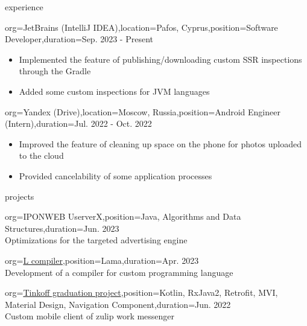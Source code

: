 \documentclass{resume}
\begin{document}
\begin{ResumeSection}{experience}
	\begin{ResumeSubsection}{org=JetBrains (IntelliJ IDEA),location={Pafos, Cyprus},position={Software Developer},duration=Sep. 2023 - Present}
        \begin{itemize}
            \item Implemented the feature of publishing/downloading custom SSR inspections through the Gradle
            \item Added some custom inspections for JVM languages
        \end{itemize}
    \end{ResumeSubsection}
	\begin{ResumeSubsection}{org=Yandex (Drive),location={Moscow, Russia},position={Android Engineer (Intern)},duration=Jul. 2022 - Oct. 2022} 
        \begin{itemize}
            \item Improved the feature of cleaning up space on the phone for photos uploaded to the cloud
            \item Provided cancelability of some application processes
        \end{itemize}
    \end{ResumeSubsection}
\end{ResumeSection}

\begin{ResumeSection}{projects}
\begin{ResumeSubsection}{org=IPONWEB UserverX,position={Java, Algorithms and Data Structures},duration={Jun. 2023}} \\
Optimizations for the targeted advertising engine \vspace{4pt}

\end{ResumeSubsection}

	\begin{ResumeSubsection}{org=\href{https://github.com/Hardes1/compilers-supplementary}{L compiler},position={Lama},duration={Apr. 2023}} \\
	Development of a compiler for custom programming language
 \vspace{4pt}

\end{ResumeSubsection}
	\begin{ResumeSubsection}{org=\href{https://github.com/Hardes1/ZulipClient}{Tinkoff graduation project},position={Kotlin, RxJava2, Retrofit, MVI, Material Design, Navigation Component},duration={Jun. 2022}} \\
Custom mobile client of zulip work messenger \vspace{4pt}
\end{ResumeSubsection}
\end{ResumeSection}
\end{document}
